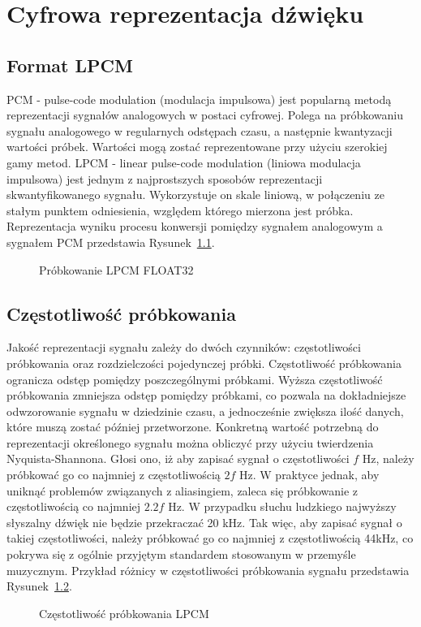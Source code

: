 \chapter{Cyfrowa reprezentacja dźwięku}

\section{Format LPCM}
PCM\cite{bib:PCM} - pulse-code modulation (modulacja impulsowa) jest popularną metodą reprezentacji sygnałów analogowych w postaci cyfrowej. Polega na próbkowaniu sygnału analogowego w regularnych odstępach czasu, a następnie kwantyzacji wartości próbek. Wartości mogą zostać reprezentowane przy użyciu szerokiej gamy metod. LPCM - linear pulse-code modulation (liniowa modulacja impulsowa) jest jednym z najprostszych sposobów reprezentacji skwantyfikowanego sygnału. Wykorzystuje on skale liniową, w połączeniu ze stałym punktem odniesienia, względem którego mierzona jest próbka. Reprezentacja wyniku procesu konwersji pomiędzy sygnałem analogowym a sygnałem PCM przedstawia Rysunek~\ref{fig:Próbkowanie LPCM FLOAT32}.
\begin{figure}[H]
    \centering
    \scalebox{1.0}{}
    \caption{Próbkowanie LPCM FLOAT32}
    \label{fig:Próbkowanie LPCM FLOAT32}
\end{figure}

\section{Częstotliwość próbkowania}
Jakość reprezentacji sygnału zależy do dwóch czynników: częstotliwości próbkowania oraz rozdzielczości pojedynczej próbki. Częstotliwość próbkowania ogranicza odstęp pomiędzy poszczególnymi próbkami. Wyższa częstotliwość próbkowania zmniejsza odstęp pomiędzy próbkami, co pozwala na dokładniejsze odwzorowanie sygnału w dziedzinie czasu, a jednocześnie zwiększa ilość danych, które muszą zostać później przetworzone. Konkretną wartość potrzebną do reprezentacji określonego sygnału można obliczyć przy użyciu twierdzenia Nyquista-Shannona\cite{bib:Nyquist-Shannon}. Głosi ono, iż aby zapisać sygnał o częstotliwości $f$ Hz, należy próbkować go co najmniej z częstotliwością $2f$ Hz. W praktyce jednak, aby uniknąć problemów związanych z aliasingiem, zaleca się próbkowanie z częstotliwością co najmniej $2.2f$ Hz. W przypadku słuchu ludzkiego najwyższy słyszalny dźwięk nie będzie przekraczać 20 kHz. Tak więc, aby zapisać sygnał o takiej częstotliwości, należy próbkować go co najmniej z częstotliwością 44kHz, co pokrywa się z ogólnie przyjętym standardem stosowanym w przemyśle muzycznym. Przykład różnicy w częstotliwości próbkowania sygnału przedstawia Rysunek~\ref{fig:Częstotliwość próbkowania LPCM}.
\begin{figure}[H]
    \centering
    \scalebox{1.0}{}
    \caption{Częstotliwość próbkowania LPCM}
    \label{fig:Częstotliwość próbkowania LPCM}
\end{figure}

